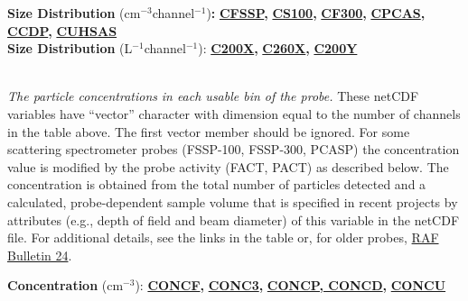 \begin{hangparagraphs}
\textbf{}%
\noindent\begin{minipage}[t]{1\columnwidth}%
\textbf{Size Distribution} ($\mathrm{cm}{}^{-3}$channel$^{-1}$)\textbf{:
}\textbf{\uline{CFSSP}}\textbf{,
}\textbf{\uline{CS100}}\textbf{}\textbf{,
}\textbf{\uline{CF300}}\textbf{,
}\textbf{\uline{CPCAS}}\textbf{,
}\textbf{\uline{CCDP}}\textbf{,
}\textbf{\uline{CUHSAS}}\\
\textbf{Size Distribution }(L\textbf{$^{-1}$}channel$^{-1}$):\textbf{
}\textbf{\uline{C200X}}\textbf{,
}\textbf{\uline{C260X}}\textbf{,
}\textbf{\uline{C200Y}}%
\end{minipage}\textbf{\label{CUHSAS}}\\
\emph{The particle concentrations}
\emph{in each usable bin of the probe.} These netCDF variables have
``vector'' character with dimension equal to the number of channels
in the table above. The first vector member should be ignored. For
some scattering spectrometer
probes (FSSP-100, FSSP-300, PCASP)
the concentration value is modified by the probe activity (FACT, PACT)
as described below. The concentration is obtained from the total number
of particles detected and a calculated, probe-dependent sample volume
that is specified in recent projects by attributes (e.g., depth of
field and beam diameter) of this variable in the netCDF file. For
additional details, see the links in the table 
or, for older probes, \href{http://www.eol.ucar.edu/raf/Bulletins/bulletin24.html}{RAF Bulletin 24}.

\begin{singlespace}
\textbf{}%
\noindent\begin{minipage}[t]{1\columnwidth}%
\begin{hangparagraphs}
\begin{singlespace}
\textbf{Concentration }(cm$^{-3}$):\textbf{ }\textbf{\uline{CONCF}}\textbf{,
}\textbf{\uline{CONC3}}\textbf{,
}\textbf{\uline{CONCP, CONCD}}\textbf{,
}\textbf{\uline{CONCU}}


\end{singlespace}
\end{hangparagraphs}
\end{minipage}
\end{singlespace}
\end{hangparagraphs}

